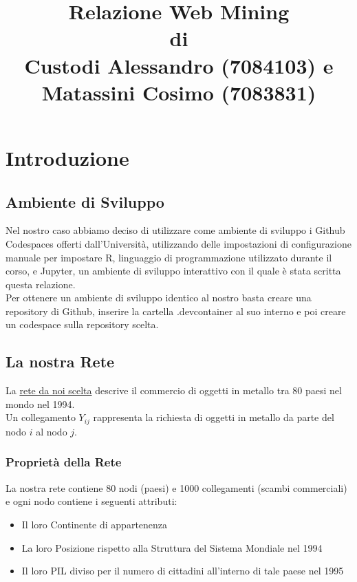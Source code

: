 \documentclass[11pt]{article}
\title{Relazione Web Mining\\
    di\\
    Custodi Alessandro (7084103) e Matassini Cosimo (7083831)}
\date{}
\providecommand{\tightlist}{%
      \setlength{\itemsep}{0pt}\setlength{\parskip}{0pt}}
\begin{document}
    
    \maketitle
    
    \tableofcontents

    \section{Introduzione}\label{introduzione}

    \subsection{Ambiente di Sviluppo}\label{ambiente-di-sviluppo}

Nel nostro caso abbiamo deciso di utilizzare come ambiente di sviluppo i
Github Codespaces offerti dall'Università, utilizzando delle
impostazioni di configurazione manuale per impostare R, linguaggio di
programmazione utilizzato durante il corso, e Jupyter, un ambiente di
sviluppo interattivo con il quale è stata scritta questa relazione.\\
Per ottenere un ambiente di sviluppo identico al nostro basta creare una
repository di Github, inserire la cartella .devcontainer al suo interno
e poi creare un codespace sulla repository scelta.

    \subsection{La nostra Rete}\label{la-nostra-rete}

La
\href{http://vlado.fmf.uni-lj.si/pub/networks/data/esna/metalWT.htm}{rete
da noi scelta} descrive il commercio di oggetti in metallo tra 80 paesi
nel mondo nel 1994.\\
Un collegamento \(Y_{ij}\) rappresenta la richiesta di oggetti in
metallo da parte del nodo \(i\) al nodo \(j\).

    \subsubsection{Proprietà della Rete}\label{proprietuxe0-della-rete}

La nostra rete contiene 80 nodi (paesi) e 1000 collegamenti (scambi
commerciali) e ogni nodo contiene i seguenti attributi:

\begin{itemize}
\tightlist
\item
  Il loro Continente di appartenenza
\item
  La loro Posizione rispetto alla Struttura del Sistema Mondiale nel
  1994
\item
  Il loro PIL diviso per il numero di cittadini all'interno di tale
  paese nel 1995
\end{itemize}
\end{document}
